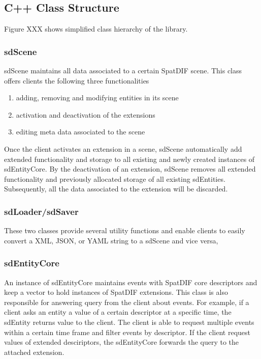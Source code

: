 \documentclass{article}
\begin{document}
\subsection{C++ Class Structure}
Figure XXX shows simplified class hierarchy of the library. 

\subsubsection{sdScene}
sdScene maintains all data associated to a certain SpatDIF scene. This class offers clients the following three functionalities

\begin{enumerate}
\item adding, removing and modifying entities in its scene
\item activation and deactivation of the extensions
\item editing meta data associated to the scene
\end{enumerate}

Once the client activates an extension in a scene, sdScene automatically add extended functionality and storage to all existing and newly created instances of sdEntityCore. By the deactivation of an extension, sdScene removes all extended functionality and previously allocated storage of all existing sdEntities. Subsequently, all the data associated to the extension will be discarded. 

\subsubsection{sdLoader/sdSaver}
These two classes provide several utility functions and enable clients to easily convert a XML, JSON, or YAML string to a sdScene and vice versa,

\subsubsection{sdEntityCore}
An instance of sdEntityCore maintains events with SpatDIF core descriptors and keep a vector to hold instances of SpatDIF extensions. This class is also responsible for answering query from the client about events. For example, if a client asks an entity a value of a certain descriptor at a specific time, the sdEntity returns value to the client. The client is able to request multiple events within a certain time frame and filter events by descriptor. If the client request values of extended desciriptors, the sdEntityCore forwards the query to the attached extension.
\end{document}
